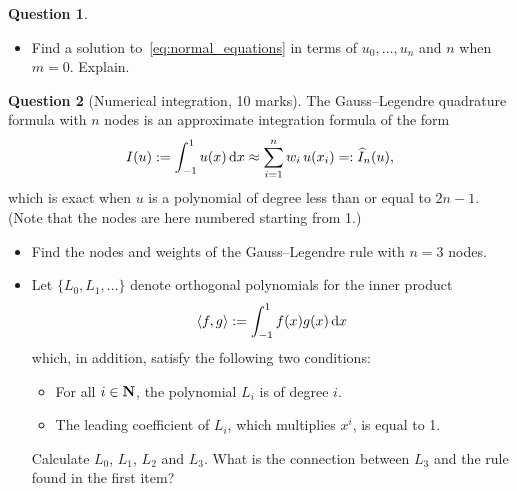 \documentclass[11pt]{article}
\theoremstyle{definition}
\newtheorem{question}{Question}
\begin{document}
\begin{question}
\begin{enumerate}
\begin{itemize}

            \item
                \mymark
                Find a solution to~\eqref{eq:normal_equations} in terms of $u_0, \dotsc, u_n$ and $n$ when $m = 0$.
                Explain.
        \end{itemize}
\end{enumerate}
\end{question}

\newpage
\begin{question}
    [Numerical integration, 10 marks]
    The Gauss--Legendre quadrature formula with $n$ nodes is an approximate integration formula of the form
    \begin{equation}
        \label{gauss_legendre}
        I(u) := \int_{-1}^{1} u(x) \, \mathrm d x \approx \sum_{i=1}^{n} w_i \, u(x_i) =: \widehat I_n(u),
    \end{equation}
    which is exact when $u$ is a polynomial of degree less than or equal to $2n-1$.
    (Note that the nodes are here numbered starting from 1.)

    \begin{itemize}
        \item
            Find the nodes and weights of the Gauss--Legendre rule with $n=3$ nodes.

        \item
            Let $\{L_0, L_1, \dotsc\}$ denote orthogonal polynomials for the inner product
            \[
                \langle f, g\rangle := \int_{-1}^{1} f(x) g(x) \, \mathrm d x
            \]
            which, in addition, satisfy the following two conditions:
            \begin{itemize}
                \item
                    For all $i \in \mathbf N$,
                    the polynomial $L_i$ is of degree $i$.

                \item
                    The leading coefficient of $L_i$,
                    which multiplies $x^i$,
                    is equal to 1.
            \end{itemize}
            Calculate $L_0$, $L_1$, $L_2$ and $L_3$.
            What is the connection between $L_3$ and the rule found in the first item?


\end{itemize}
\end{question}
\end{document}
